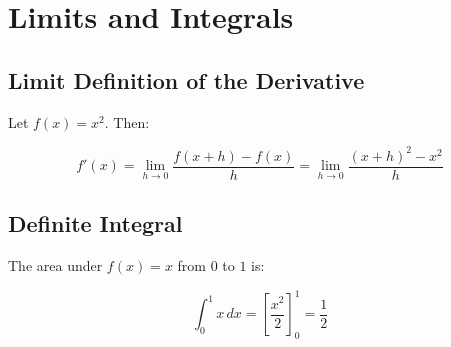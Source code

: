 \documentclass{article}
\begin{document}
\section*{Limits and Integrals}

\subsection*{Limit Definition of the Derivative}
Let \( f(x) = x^2 \). Then:

\[
f'(x) = \lim_{h \to 0} \frac{f(x+h) - f(x)}{h} = \lim_{h \to 0} \frac{(x+h)^2 - x^2}{h}
\]

\subsection*{Definite Integral}
The area under \( f(x) = x \) from \( 0 \) to \( 1 \) is:

\[
\int_0^1 x \, dx = \left[\frac{x^2}{2}\right]_0^1 = \frac{1}{2}
\]
\end{document}
